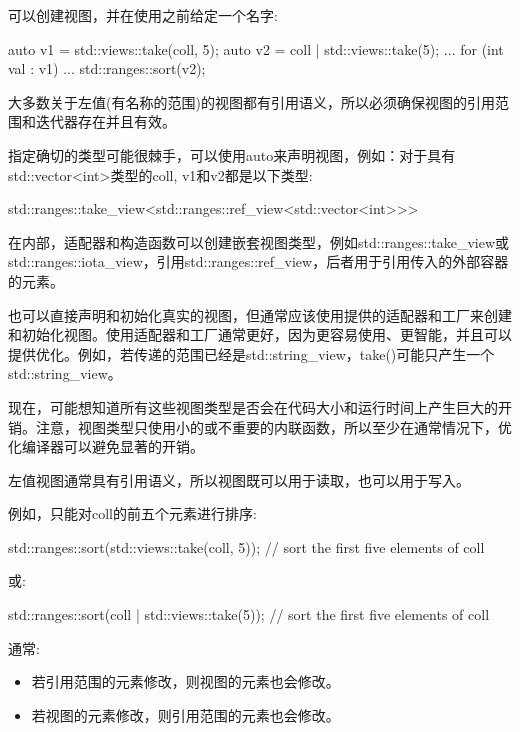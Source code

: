 可以创建视图，并在使用之前给定一个名字:

\begin{cpp}
auto v1 = std::views::take(coll, 5);
auto v2 = coll | std::views::take(5);
...
for (int val : v1) {
	...
}
std::ranges::sort(v2);
\end{cpp}

大多数关于左值(有名称的范围)的视图都有引用语义，所以必须确保视图的引用范围和迭代器存在并且有效。

指定确切的类型可能很棘手，可以使用auto来声明视图，例如：对于具有std::vector<int>类型的coll, v1和v2都是以下类型:

\begin{cpp}
std::ranges::take_view<std::ranges::ref_view<std::vector<int>>>
\end{cpp}

在内部，适配器和构造函数可以创建嵌套视图类型，例如std::ranges::take\_view或std::ranges::iota\_view，引用std::ranges::ref\_view，后者用于引用传入的外部容器的元素。

也可以直接声明和初始化真实的视图，但通常应该使用提供的适配器和工厂来创建和初始化视图。使用适配器和工厂通常更好，因为更容易使用、更智能，并且可以提供优化。例如，若传递的范围已经是std::string\_view，take()可能只产生一个std::string\_view。

现在，可能想知道所有这些视图类型是否会在代码大小和运行时间上产生巨大的开销。注意，视图类型只使用小的或不重要的内联函数，所以至少在通常情况下，优化编译器可以避免显著的开销。


左值视图通常具有引用语义，所以视图既可以用于读取，也可以用于写入。

例如，只能对coll的前五个元素进行排序:

\begin{cpp}
std::ranges::sort(std::views::take(coll, 5)); // sort the first five elements of coll
\end{cpp}

或:

\begin{cpp}
std::ranges::sort(coll | std::views::take(5)); // sort the first five elements of coll
\end{cpp}

通常:

\begin{itemize}
\item
若引用范围的元素修改，则视图的元素也会修改。

\item
若视图的元素修改，则引用范围的元素也会修改。
\end{itemize}

